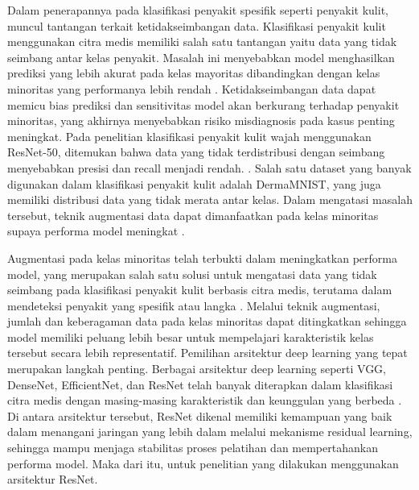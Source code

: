 Dalam penerapannya pada klasifikasi penyakit spesifik seperti penyakit 
kulit, muncul tantangan terkait ketidakseimbangan data. 
Klasifikasi penyakit kulit menggunakan citra medis memiliki salah satu 
tantangan yaitu data yang tidak seimbang 
antar kelas penyakit. Masalah ini menyebabkan model menghasilkan prediksi 
yang lebih akurat pada kelas mayoritas dibandingkan dengan kelas minoritas 
yang performanya lebih rendah \cite{nurkhasanah2021klasifikasi}. 
Ketidakseimbangan data dapat memicu bias prediksi dan sensitivitas model 
akan berkurang terhadap penyakit minoritas, yang akhirnya menyebabkan 
risiko misdiagnosis pada kasus penting meningkat. Pada penelitian 
klasifikasi penyakit kulit wajah menggunakan ResNet-50, ditemukan bahwa 
data yang tidak terdistribusi dengan seimbang menyebabkan presisi dan 
recall menjadi rendah. \cite{khani2025penerapan}.
Salah satu dataset yang banyak digunakan dalam klasifikasi penyakit kulit
adalah DermaMNIST, yang juga memiliki distribusi data yang tidak merata
antar kelas. Dalam mengatasi masalah tersebut, teknik augmentasi data 
dapat dimanfaatkan pada kelas minoritas supaya performa model meningkat \cite{prananda2024klasifikasikan}. \par

Augmentasi pada kelas minoritas telah terbukti dalam meningkatkan
performa model, yang merupakan salah satu solusi untuk mengatasi data yang
tidak seimbang pada klasifikasi penyakit kulit berbasis citra medis, 
terutama dalam mendeteksi penyakit yang spesifik atau langka \cite{chazar2025pendekatan}. 
Melalui teknik augmentasi, jumlah dan keberagaman 
data pada kelas minoritas dapat ditingkatkan sehingga model memiliki 
peluang lebih besar untuk mempelajari karakteristik kelas tersebut secara 
lebih representatif. Pemilihan arsitektur deep learning yang tepat 
merupakan langkah penting. Berbagai arsitektur deep learning seperti 
VGG, DenseNet, EfficientNet, dan ResNet telah banyak diterapkan dalam 
klasifikasi citra medis dengan masing-masing karakteristik dan keunggulan 
yang berbeda \cite{Berliani_Rahardja_Septiana_2023} \cite{Ade_Maulani_Bilgis_Nurhadi_Surojudin_Ahmad_Fauzi_2025} \cite{kadric2025improvingdiagnosticaccuracypigmented}. 
Di antara arsitektur tersebut, ResNet dikenal memiliki 
kemampuan yang baik dalam menangani jaringan yang lebih dalam melalui 
mekanisme residual learning, sehingga mampu menjaga stabilitas proses 
pelatihan dan mempertahankan performa model. Maka dari itu, untuk penelitian 
yang dilakukan menggunakan arsitektur ResNet. \par

